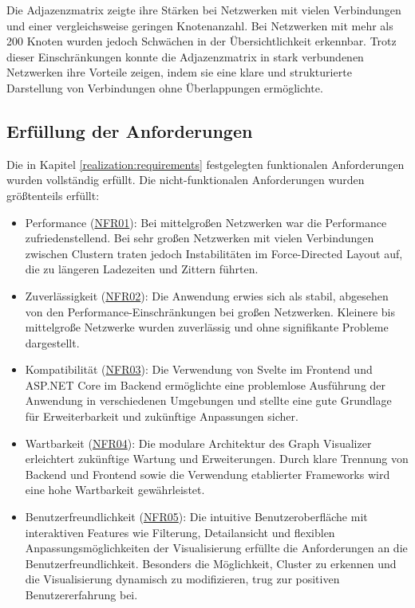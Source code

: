 Die Adjazenzmatrix zeigte ihre Stärken bei Netzwerken mit vielen Verbindungen und einer vergleichsweise geringen Knotenanzahl. Bei Netzwerken mit mehr als 200 Knoten wurden jedoch Schwächen in der Übersichtlichkeit erkennbar. Trotz dieser Einschränkungen konnte die Adjazenzmatrix in stark verbundenen Netzwerken ihre Vorteile zeigen, indem sie eine klare und strukturierte Darstellung von Verbindungen ohne Überlappungen ermöglichte.

\subsection{Erfüllung der Anforderungen}

Die in Kapitel \ref{realization:requirements} festgelegten funktionalen  Anforderungen wurden vollständig erfüllt. Die nicht-funktionalen Anforderungen wurden größtenteils erfüllt:

\begin{itemize}
    \item Performance (\hyperref[NFR01]{NFR01}): Bei mittelgroßen Netzwerken war die Performance zufriedenstellend. Bei sehr großen Netzwerken mit vielen Verbindungen zwischen Clustern traten jedoch Instabilitäten im Force-Directed Layout auf, die zu längeren Ladezeiten und Zittern führten.
    \item Zuverlässigkeit (\hyperref[NFR02]{NFR02}): Die Anwendung erwies sich als stabil, abgesehen von den Performance-Einschränkungen bei großen Netzwerken. Kleinere bis mittelgroße Netzwerke wurden zuverlässig und ohne signifikante Probleme dargestellt.
    \item Kompatibilität (\hyperref[NFR03]{NFR03}): Die Verwendung von Svelte im Frontend und ASP.NET Core im Backend ermöglichte eine problemlose Ausführung der Anwendung in verschiedenen Umgebungen und stellte eine gute Grundlage für Erweiterbarkeit und zukünftige Anpassungen sicher.
    \item Wartbarkeit (\hyperref[NFR04]{NFR04}): Die modulare Architektur des Graph Visualizer erleichtert zukünftige Wartung und Erweiterungen. Durch klare Trennung von Backend und Frontend sowie die Verwendung etablierter Frameworks wird eine hohe Wartbarkeit gewährleistet.
    \item Benutzerfreundlichkeit (\hyperref[NFR05]{NFR05}): Die intuitive Benutzeroberfläche mit interaktiven Features wie Filterung, Detailansicht und flexiblen Anpassungsmöglichkeiten der Visualisierung erfüllte die Anforderungen an die Benutzerfreundlichkeit. Besonders die Möglichkeit, Cluster zu erkennen und die Visualisierung dynamisch zu modifizieren, trug zur positiven Benutzererfahrung bei.
\end{itemize}

